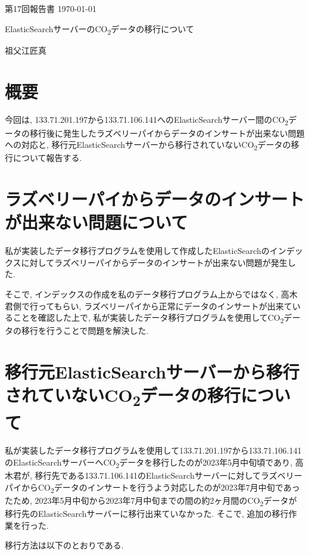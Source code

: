 \documentclass[a4j,12pt,]{jarticle}
\begin{document}
{\noindent\small 第17回報告書 \hfill\today}
\begin{center}
  {\Large ElasticSearchサーバーのCO\textsubscript{2}データの移行について}
\end{center}
\begin{flushright}
  祖父江匠真 \\
\end{flushright}

\section{概要}
今回は, 133.71.201.197から133.71.106.141へのElasticSearchサーバー間のCO\textsubscript{2}データの移行後に発生したラズベリーパイからデータのインサートが出来ない問題への対応と, 移行元ElasticSearchサーバーから移行されていないCO\textsubscript{2}データの移行について報告する.

\section{ラズベリーパイからデータのインサートが出来ない問題について}

私が実装したデータ移行プログラムを使用して作成したElasticSearchのインデックスに対してラズベリーパイからデータのインサートが出来ない問題が発生した.

そこで, インデックスの作成を私のデータ移行プログラム上からではなく, 高木君側で行ってもらい, ラズベリーパイから正常にデータのインサートが出来ていることを確認した上で, 私が実装したデータ移行プログラムを使用してCO\textsubscript{2}データの移行を行うことで問題を解決した.

\section{移行元ElasticSearchサーバーから移行されていないCO\textsubscript{2}データの移行について}

私が実装したデータ移行プログラムを使用して133.71.201.197から133.71.106.141のElasticSearchサーバーへCO\textsubscript{2}データを移行したのが2023年5月中旬頃であり, 高木君が, 移行先である133.71.106.141のElasticSearchサーバーに対してラズベリーパイからCO\textsubscript{2}データのインサートを行うよう対応したのが2023年7月中旬であったため, 2023年5月中旬から2023年7月中旬までの間の約2ヶ月間のCO\textsubscript{2}データが移行先のElasticSearchサーバーに移行出来ていなかった. そこで, 追加の移行作業を行った.

移行方法は以下のとおりである.
\end{document}
